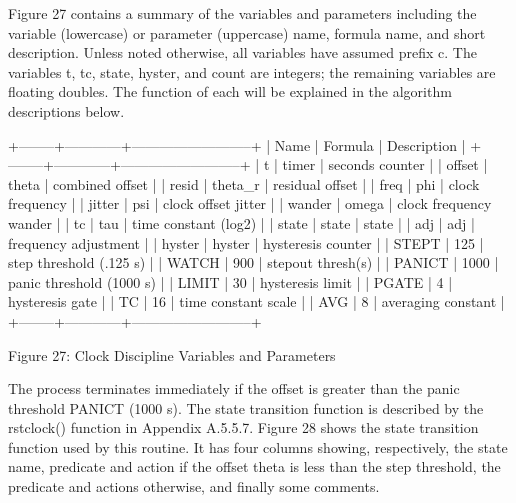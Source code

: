 Figure 27 contains a summary of the variables and parameters
including the variable (lowercase) or parameter (uppercase) name,
formula name, and short description.  Unless noted otherwise, all
variables have assumed prefix c.  The variables t, tc, state, hyster,
and count are integers; the remaining variables are floating doubles.
The function of each will be explained in the algorithm descriptions
below.

                +--------+------------+--------------------------+
            | Name   | Formula    | Description              |
            +--------+------------+--------------------------+
            | t      | timer      | seconds counter          |
            | offset | theta      | combined offset          |
            | resid  | theta\_r    | residual offset          |
            | freq   | phi        | clock frequency          |
            | jitter | psi        | clock offset jitter      |
            | wander | omega      | clock frequency wander   |
            | tc     | tau        | time constant (log2)     |
            | state  | state      | state                    |
            | adj    | adj        | frequency adjustment     |
            | hyster | hyster     | hysteresis counter       |
            | STEPT  | 125        | step threshold (.125 s)  |
            | WATCH  | 900        | stepout thresh(s)        |
            | PANICT | 1000       | panic threshold (1000 s) |
            | LIMIT  | 30         | hysteresis limit         |
            | PGATE  | 4          | hysteresis gate          |
            | TC     | 16         | time constant scale      |
            | AVG    | 8          | averaging constant       |
            +--------+------------+--------------------------+

        Figure 27: Clock Discipline Variables and Parameters

The process terminates immediately if the offset is greater than the
panic threshold PANICT (1000 s).  The state transition function is
described by the rstclock() function in Appendix A.5.5.7.  Figure 28
shows the state transition function used by this routine.  It has
four columns showing, respectively, the state name, predicate and
action if the offset theta is less than the step threshold, the
predicate and actions otherwise, and finally some comments.

